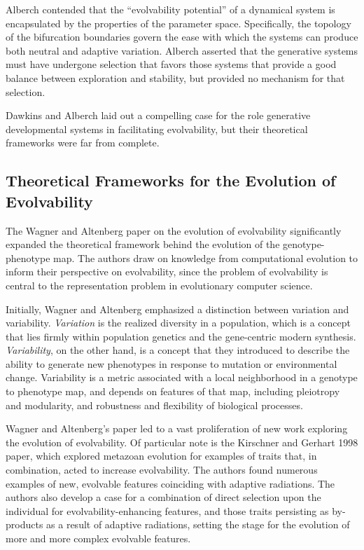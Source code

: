 \documentclass[PhD]{msu-thesis}
\begin{document}
Alberch contended that the “evolvability potential” of a dynamical system is encapsulated by the properties of the parameter space. Specifically, the topology of the bifurcation boundaries govern the ease with which the systems can produce both neutral and adaptive variation. Alberch asserted that the generative systems must have undergone selection that favors those systems that provide a good balance between exploration and stability, but provided no mechanism for that selection.

Dawkins and Alberch laid out a compelling case for the role generative developmental systems in facilitating evolvability, but their theoretical frameworks were far from complete.


\subsection{Theoretical Frameworks for the Evolution of Evolvability}
The Wagner and Altenberg paper on the evolution of evolvability significantly expanded the theoretical framework behind the evolution of the genotype-phenotype map\cite{gunter_p._wagner_perspective:_1996}. The authors draw on knowledge from computational evolution to inform their perspective on evolvability, since the problem of evolvability is central to the representation problem in evolutionary computer science. 

Initially, Wagner and Altenberg emphasized a distinction between variation and variability. \textit{Variation} is the realized diversity in a population, which is a concept that lies firmly within population genetics and the gene-centric modern synthesis. \textit{Variability}, on the other hand, is a concept that they introduced to describe the ability to generate new phenotypes in response to mutation or environmental change. Variability is a metric associated with a local neighborhood in a genotype to phenotype map, and depends on features of that map, including pleiotropy and modularity, and robustness and flexibility of biological processes.

Wagner and Altenberg’s paper led to a vast proliferation of new work exploring the evolution of evolvability. Of particular note is the Kirschner and Gerhart 1998 paper\cite{kirschner_evolvability_1998}, which explored metazoan evolution for examples of traits that, in combination, acted to increase evolvability. The authors found numerous examples of new, evolvable features coinciding with adaptive radiations. The authors also develop a case for a combination of direct selection upon the individual for evolvability-enhancing features, and those traits persisting as by-products as a result of adaptive radiations, setting the stage for the evolution of more and more complex evolvable features.
\end{document}
